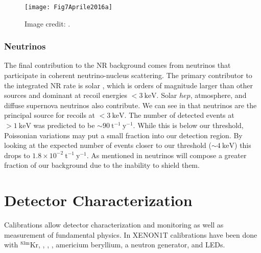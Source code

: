 \begin{figure}
\centering
\texttt{[image: Fig7Aprile2016a]}
\caption{Image credit: .}
\label{fig:backgrounds_nuclear_muon_induced_nr_rate}
\end{figure}



\subsubsection{Neutrinos}
\label{subsubsec:backgrounds_nuclear_neutrinos}
The final contribution to the NR background comes from neutrinos that participate in coherent neutrino-nucleus scattering.  The primary
contributor to the integrated NR rate is solar , which is orders of magnitude larger than other sources and dominant at
recoil energies $< 3\ \mathrm{keV}$.  Solar $hep$, atmosphere, and diffuse supernova neutrinos also contribute.  We can see in
 that neutrinos are the principal source for recoils at $< 3\ \mathrm{keV}$.  The
number of detected events at $> 1\ \mathrm{keV}$ was predicted to be ${\sim} 90\ \mathrm{t^{-1}\ y^{-1}}$.  While this is below our
threshold, Poissonian variations may put a small fraction into our detection region.  By looking at the expected number of events closer
to our threshold (${\sim} 4\ \mathrm{keV}$) this drops to $1.8 \times 10^{-2}\ \mathrm{t^{-1}\ y^{-1}}$.  As mentioned in
 neutrinos will compose a greater fraction of our background due to the inability
to shield them.



\section{Detector Characterization}
\label{sec:det_char}
Calibrations allow detector characterization and monitoring as well as measurement of fundamental physics.  In XENON1T calibrations have
been done with $\mathrm{^{83m}Kr}$, , , , americium beryllium, a neutron generator, and LEDs.


